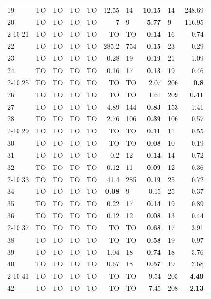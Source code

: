 \begin{longtable}{lr@{\hskip 4pt}l@{\hskip 12pt}r@{\hskip 4pt}l@{\hskip 12pt}r@{\hskip 4pt}l@{\hskip 12pt}r@{\hskip 4pt}l@{\hskip 12pt}r}
19 & TO & TO & TO & TO & 12.55 & 14 & \textbf{10.15} & 14 & 248.69 \\
20 & TO & TO & TO & TO & 7 & 9 & \textbf{5.77} & 9 & 116.95 \\
\cmidrule{2-10}
21 & TO & TO & TO & TO & TO & TO & \textbf{0.14} & 16 & 0.74 \\
22 & TO & TO & TO & TO & 285.2 & 754 & \textbf{0.15} & 23 & 0.29 \\
23 & TO & TO & TO & TO & 0.28 & 19 & \textbf{0.19} & 21 & 1.09 \\
24 & TO & TO & TO & TO & 0.16 & 17 & \textbf{0.13} & 19 & 0.46 \\
\cmidrule{2-10}
25 & TO & TO & TO & TO & TO & TO & 2.07 & 206 & \textbf{0.8} \\
26 & TO & TO & TO & TO & TO & TO & 1.61 & 209 & \textbf{0.41} \\
27 & TO & TO & TO & TO & 4.89 & 144 & \textbf{0.83} & 153 & 1.41 \\
28 & TO & TO & TO & TO & 2.76 & 106 & \textbf{0.39} & 106 & 0.57 \\
\cmidrule{2-10}
29 & TO & TO & TO & TO & TO & TO & \textbf{0.11} & 11 & 0.55 \\
30 & TO & TO & TO & TO & TO & TO & \textbf{0.08} & 10 & 0.19 \\
31 & TO & TO & TO & TO & 0.2 & 12 & \textbf{0.14} & 14 & 0.72 \\
32 & TO & TO & TO & TO & 0.12 & 11 & \textbf{0.09} & 12 & 0.36 \\
\cmidrule{2-10}
33 & TO & TO & TO & TO & 41.4 & 285 & \textbf{0.19} & 25 & 0.72 \\
34 & TO & TO & TO & TO & \textbf{0.08} & 9 & 0.15 & 25 & 0.37 \\
35 & TO & TO & TO & TO & 0.22 & 17 & \textbf{0.14} & 19 & 0.89 \\
36 & TO & TO & TO & TO & 0.12 & 12 & \textbf{0.08} & 13 & 0.44 \\
\cmidrule{2-10}
37 & TO & TO & TO & TO & TO & TO & \textbf{0.68} & 17 & 3.91 \\
38 & TO & TO & TO & TO & TO & TO & \textbf{0.58} & 19 & 0.97 \\
39 & TO & TO & TO & TO & 1.04 & 18 & \textbf{0.74} & 18 & 5.76 \\
40 & TO & TO & TO & TO & 0.67 & 18 & \textbf{0.57} & 19 & 2.68 \\
\cmidrule{2-10}
41 & TO & TO & TO & TO & TO & TO & 9.54 & 205 & \textbf{4.49} \\
42 & TO & TO & TO & TO & TO & TO & 7.45 & 208 & \textbf{2.13} \\

\end{longtable}
